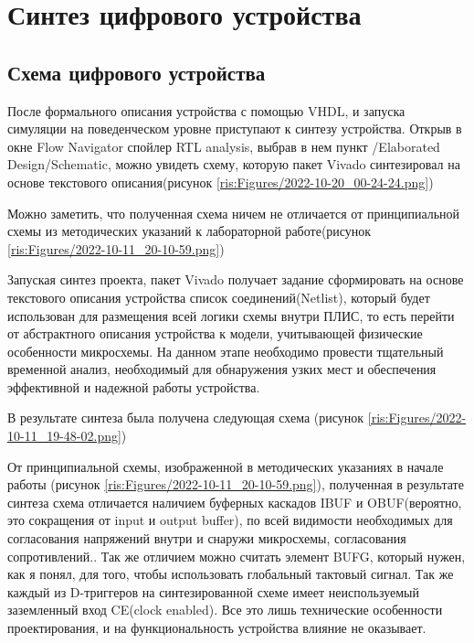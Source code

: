 \begin{sloppypar}
\newpage %
\section{Синтез цифрового устройства} %
\subsection{Схема цифрового устройства} %

После формального описания устройства с помощью VHDL, и запуска симуляции на поведенческом уровне приступают к синтезу устройства. Открыв в окне Flow Navigator спойлер RTL analysis, выбрав в нем пункт /Elaborated Design/Schematic, можно увидеть схему, которую пакет Vivado синтезировал на основе текстового описания(рисунок \ref{ris:Figures/2022-10-20_00-24-24.png})


Можно заметить, что полученная схема ничем не отличается от принципиальной схемы из методических указаний к лабораторной работе(рисунок \ref{ris:Figures/2022-10-11_20-10-59.png})

Запуская синтез проекта, пакет Vivado получает задание сформировать на основе текстового описания устройства список соединений(Netlist), который будет использован для размещения всей логики схемы внутри ПЛИС, то есть перейти от абстрактного описания устройства к модели, учитывающей физические особенности микросхемы. На данном этапе необходимо провести тщательный временной анализ, необходимый для обнаружения узких мест и обеспечения эффективной и надежной работы устройства. 

В результате синтеза была получена следующая схема (рисунок \ref{ris:Figures/2022-10-11_19-48-02.png})


От принципиальной схемы, изображенной в методических указаниях в начале работы (рисунок \ref{ris:Figures/2022-10-11_20-10-59.png}), полученная в результате синтеза схема отличается наличием буферных каскадов IBUF и OBUF(вероятно, это сокращения от input и output buffer), по всей видимости необходимых для согласования напряжений внутри и снаружи микросхемы, согласования сопротивлений.. Так же отличием можно считать элемент BUFG, который нужен, как я понял, для того, чтобы использовать глобальный тактовый сигнал. Так же каждый из D-триггеров на синтезированной схеме имеет неиспользуемый заземленный вход CE(clock enabled). Все это лишь технические особенности проектирования, и на функциональность устройства влияние не оказывает.
\newpage

\end{sloppypar}
